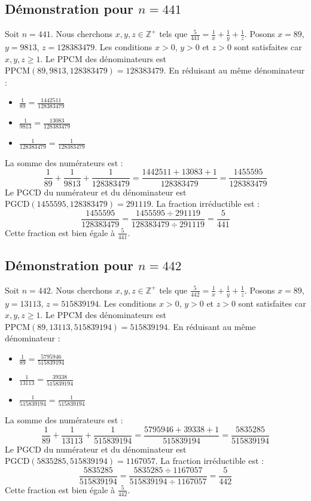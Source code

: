 \documentclass[11pt,a4paper]{article}
\begin{document}
\subsection{Démonstration pour $n = 441$}
Soit $n = 441$. Nous cherchons $x, y, z \in \mathbb{Z}^{+}$ tels que $\frac{5}{441} = \frac{1}{x} + \frac{1}{y} + \frac{1}{z}$.
Posons $x = 89$, $y = 9813$, $z = 128383479$.
Les conditions $x > 0$, $y > 0$ et $z > 0$ sont satisfaites car $x, y, z \geq 1$.
Le PPCM des dénominateurs est $\text{PPCM}(89, 9813, 128383479) = 128383479$.
En réduisant au même dénominateur :
\begin{itemize}
    \item $\frac{1}{89} = \frac{1442511}{128383479}$
    \item $\frac{1}{9813} = \frac{13083}{128383479}$
    \item $\frac{1}{128383479} = \frac{1}{128383479}$
\end{itemize}
La somme des numérateurs est :
$$ \frac{1}{89} + \frac{1}{9813} + \frac{1}{128383479} = \frac{1442511 + 13083 + 1}{128383479} = \frac{1455595}{128383479} $$
Le PGCD du numérateur et du dénominateur est $\text{PGCD}(1455595, 128383479) = 291119$.
La fraction irréductible est :
$$ \frac{1455595}{128383479} = \frac{1455595 \div 291119}{128383479 \div 291119} = \frac{5}{441} $$
Cette fraction est bien égale à $\frac{5}{441}$.

\subsection{Démonstration pour $n = 442$}
Soit $n = 442$. Nous cherchons $x, y, z \in \mathbb{Z}^{+}$ tels que $\frac{5}{442} = \frac{1}{x} + \frac{1}{y} + \frac{1}{z}$.
Posons $x = 89$, $y = 13113$, $z = 515839194$.
Les conditions $x > 0$, $y > 0$ et $z > 0$ sont satisfaites car $x, y, z \geq 1$.
Le PPCM des dénominateurs est $\text{PPCM}(89, 13113, 515839194) = 515839194$.
En réduisant au même dénominateur :
\begin{itemize}
    \item $\frac{1}{89} = \frac{5795946}{515839194}$
    \item $\frac{1}{13113} = \frac{39338}{515839194}$
    \item $\frac{1}{515839194} = \frac{1}{515839194}$
\end{itemize}
La somme des numérateurs est :
$$ \frac{1}{89} + \frac{1}{13113} + \frac{1}{515839194} = \frac{5795946 + 39338 + 1}{515839194} = \frac{5835285}{515839194} $$
Le PGCD du numérateur et du dénominateur est $\text{PGCD}(5835285, 515839194) = 1167057$.
La fraction irréductible est :
$$ \frac{5835285}{515839194} = \frac{5835285 \div 1167057}{515839194 \div 1167057} = \frac{5}{442} $$
Cette fraction est bien égale à $\frac{5}{442}$.
\end{document}
